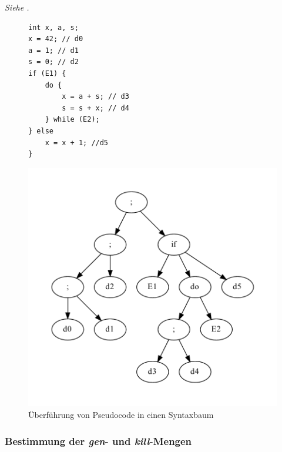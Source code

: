 \textit{Siehe .}
\begin{figure}
    \hfill
    \begin{minipage}{0.4\textwidth}
        \centering
        \begin{lstlisting}
int x, a, s;
x = 42; // d0
a = 1; // d1
s = 0; // d2
if (E1) {
    do {
        x = a + s; // d3
        s = s + x; // d4
    } while (E2);
} else
    x = x + 1; //d5
}
        \end{lstlisting}
    \end{minipage}
    \hfill
    \begin{minipage}{0.5\textwidth}
        \includegraphics[scale=0.5]{images/convent-ast.pdf}
    \end{minipage}
    \hfill
    \caption{Überführung von Pseudocode in einen Syntaxbaum}
    \label{convent:ast}
\end{figure}


\subsubsection{Bestimmung der \textit{gen}- und \textit{kill}-Mengen}

